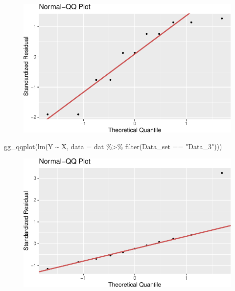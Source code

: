 \documentclass[
  letterpaper,
  DIV=11,
  numbers=noendperiod]{scrreprt}
\newenvironment{Shaded}{\begin{snugshade}}{\end{snugshade}}
\newcommand{\AttributeTok}[1]{\textcolor[rgb]{0.40,0.45,0.13}{#1}}
\newcommand{\FunctionTok}[1]{\textcolor[rgb]{0.28,0.35,0.67}{#1}}
\newcommand{\NormalTok}[1]{\textcolor[rgb]{0.00,0.23,0.31}{#1}}
\newcommand{\SpecialCharTok}[1]{\textcolor[rgb]{0.37,0.37,0.37}{#1}}
\newcommand{\StringTok}[1]{\textcolor[rgb]{0.13,0.47,0.30}{#1}}
\begin{document}
\begin{figure}[H]

{\centering \includegraphics{./08-linearreg_files/figure-pdf/unnamed-chunk-27-2.pdf}

}

\end{figure}

\begin{Shaded}
\begin{Highlighting}[]
\FunctionTok{gg\_qqplot}\NormalTok{(}\FunctionTok{lm}\NormalTok{(Y }\SpecialCharTok{\textasciitilde{}}\NormalTok{ X, }\AttributeTok{data =}\NormalTok{ dat }\SpecialCharTok{\%\textgreater{}\%} \FunctionTok{filter}\NormalTok{(Data\_set }\SpecialCharTok{==} \StringTok{"Data\_3"}\NormalTok{)))}
\end{Highlighting}
\end{Shaded}

\begin{figure}[H]

{\centering \includegraphics{./08-linearreg_files/figure-pdf/unnamed-chunk-27-3.pdf}

}

\end{figure}
\end{document}
